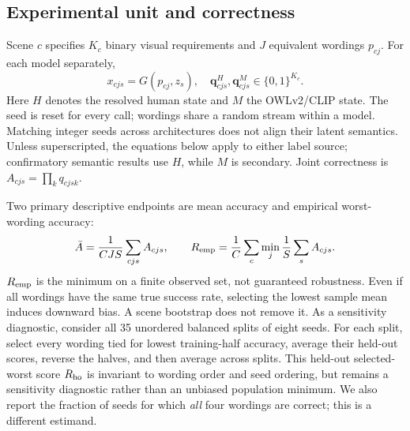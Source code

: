 \documentclass[10pt,letterpaper]{article}
\newcommand{\q}{\boldsymbol{q}}
\begin{document}
\subsection{Experimental unit and correctness}
Scene $c$ specifies $K_c$ binary visual requirements and $J$ equivalent wordings $p_{cj}$. For each model separately,
\begin{equation}
 x_{cjs}=G(p_{cj},z_s),\quad \q^{H}_{cjs},\q^{M}_{cjs}\in\{0,1\}^{K_c}.
\end{equation}
Here $H$ denotes the resolved human state and $M$ the OWLv2/CLIP state. The seed is reset for every call; wordings share a random stream within a model. Matching integer seeds across architectures does not align their latent semantics. Unless superscripted, the equations below apply to either label source; confirmatory semantic results use $H$, while $M$ is secondary. Joint correctness is $A_{cjs}=\prod_k q_{cjsk}$.

Two primary descriptive endpoints are mean accuracy and empirical worst-wording accuracy:
\begin{equation}
 \bar A=\frac{1}{CJS}\sum_{cjs}A_{cjs},\qquad
 R_{\rm emp}=\frac1C\sum_c\min_j\frac1S\sum_s A_{cjs}.
\end{equation}
$R_{\rm emp}$ is the minimum on a finite observed set, not guaranteed robustness. Even if all wordings have the same true success rate, selecting the lowest sample mean induces downward bias. A scene bootstrap does not remove it. As a sensitivity diagnostic, consider all 35 unordered balanced splits of eight seeds. For each split, select every wording tied for lowest training-half accuracy, average their held-out scores, reverse the halves, and then average across splits. This held-out selected-worst score $R_{\rm ho}$ is invariant to wording order and seed ordering, but remains a sensitivity diagnostic rather than an unbiased population minimum. We also report the fraction of seeds for which \emph{all} four wordings are correct; this is a different estimand.
\end{document}
